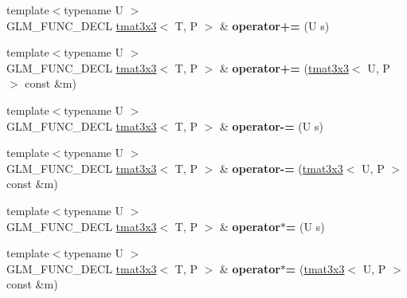 \begin{DoxyCompactItemize}
\item 
\mbox{\label{structglm_1_1tmat3x3_a5bf05bc4653ffe3fccf1a04c04892f64}} 
{\footnotesize template$<$typename U $>$ }\\G\+L\+M\+\_\+\+F\+U\+N\+C\+\_\+\+D\+E\+CL \hyperlink{structglm_1_1tmat3x3}{tmat3x3}$<$ T, P $>$ \& {\bfseries operator+=} (U s)
\item 
\mbox{\label{structglm_1_1tmat3x3_af0582e969c35858f4d11afc5327c3d4b}} 
{\footnotesize template$<$typename U $>$ }\\G\+L\+M\+\_\+\+F\+U\+N\+C\+\_\+\+D\+E\+CL \hyperlink{structglm_1_1tmat3x3}{tmat3x3}$<$ T, P $>$ \& {\bfseries operator+=} (\hyperlink{structglm_1_1tmat3x3}{tmat3x3}$<$ U, P $>$ const \&m)
\item 
\mbox{\label{structglm_1_1tmat3x3_a50e65bdba7c569ff3fb987d0e9dedaa1}} 
{\footnotesize template$<$typename U $>$ }\\G\+L\+M\+\_\+\+F\+U\+N\+C\+\_\+\+D\+E\+CL \hyperlink{structglm_1_1tmat3x3}{tmat3x3}$<$ T, P $>$ \& {\bfseries operator-\/=} (U s)
\item 
\mbox{\label{structglm_1_1tmat3x3_aab14e291cf845dc23bc569524ee341c8}} 
{\footnotesize template$<$typename U $>$ }\\G\+L\+M\+\_\+\+F\+U\+N\+C\+\_\+\+D\+E\+CL \hyperlink{structglm_1_1tmat3x3}{tmat3x3}$<$ T, P $>$ \& {\bfseries operator-\/=} (\hyperlink{structglm_1_1tmat3x3}{tmat3x3}$<$ U, P $>$ const \&m)
\item 
\mbox{\label{structglm_1_1tmat3x3_a42fa6d5be3660d80e31fe192c15df2c4}} 
{\footnotesize template$<$typename U $>$ }\\G\+L\+M\+\_\+\+F\+U\+N\+C\+\_\+\+D\+E\+CL \hyperlink{structglm_1_1tmat3x3}{tmat3x3}$<$ T, P $>$ \& {\bfseries operator$\ast$=} (U s)
\item 
\mbox{\label{structglm_1_1tmat3x3_a47400ed8c5e80c7a0c44d1ca79acc556}} 
{\footnotesize template$<$typename U $>$ }\\G\+L\+M\+\_\+\+F\+U\+N\+C\+\_\+\+D\+E\+CL \hyperlink{structglm_1_1tmat3x3}{tmat3x3}$<$ T, P $>$ \& {\bfseries operator$\ast$=} (\hyperlink{structglm_1_1tmat3x3}{tmat3x3}$<$ U, P $>$ const \&m)
\item 

\end{DoxyCompactItemize}

